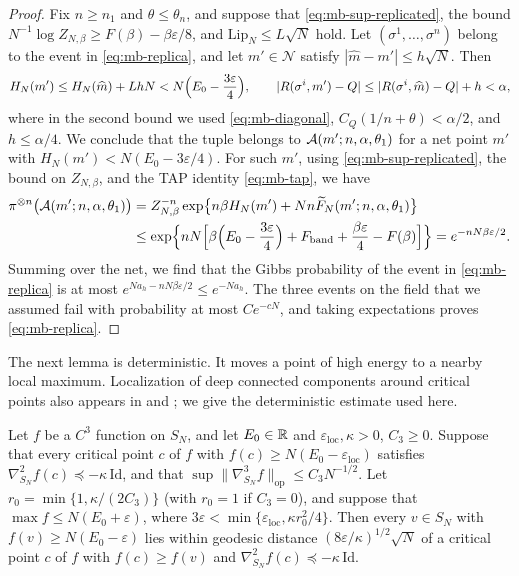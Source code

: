 \begin{proof}
Fix $n\ge n_1$ and $\theta\le\theta_n$, and suppose that \eqref{eq:mb-sup-replicated}, the bound $N^{-1}\log Z_{N,\beta}\ge F(\beta)-\beta\varepsilon/8$, and $\mathrm{Lip}_N\le L\sqrt N$ hold. Let $(\sigma^1,\dots,\sigma^n)$ belong to the event in \eqref{eq:mb-replica}, and let $m'\in\mathcal N$ satisfy $|\widehat m-m'|\le h\sqrt N$. Then
\[
H_N(m')\le H_N(\widehat m)+LhN<N\Bigl(E_0-\frac{3\varepsilon}4\Bigr),\qquad |R(\sigma^i,m')-Q|\le|R(\sigma^i,\widehat m)-Q|+h<\alpha,
\]
where in the second bound we used \eqref{eq:mb-diagonal}, $C_Q(1/n+\theta)<\alpha/2$, and $h\le\alpha/4$. We conclude that the tuple belongs to $\mathcal A(m';n,\alpha,\theta_1)$ for a net point $m'$ with $H_N(m')<N(E_0-3\varepsilon/4)$. For such $m'$, using \eqref{eq:mb-sup-replicated}, the bound on $Z_{N,\beta}$, and the TAP identity \eqref{eq:mb-tap}, we have
\[
\begin{aligned}
\pi^{\otimes n}\bigl(\mathcal A(m';n,\alpha,\theta_1)\bigr)&=Z_{N,\beta}^{-n}\exp\bigl\{n\beta H_N(m')+Nn\widetilde F_N(m';n,\alpha,\theta_1)\bigr\}\\
&\le\exp\Bigl\{nN\Bigl[\beta\Bigl(E_0-\frac{3\varepsilon}4\Bigr)+F_{\mathrm{band}}+\frac{\beta\varepsilon}4-F(\beta)\Bigr]\Bigr\}=e^{-nN\beta\varepsilon/2}.
\end{aligned}
\]
Summing over the net, we find that the Gibbs probability of the event in \eqref{eq:mb-replica} is at most $e^{Na_h-nN\beta\varepsilon/2}\le e^{-Na_h}$. The three events on the field that we assumed fail with probability at most $Ce^{-cN}$, and taking expectations proves \eqref{eq:mb-replica}.
\end{proof}

The next lemma is deterministic. It moves a point of high energy to a nearby local maximum. Localization of deep connected components around critical points also appears in \cite[Proposition~39]{BenArousSubagZeitouni2020} and \cite[Corollary~1.5 and its proof]{Sellke2025marginal}; we give the deterministic estimate used here.

\begin{lemma}\label{lem:mb-localization}
Let $f$ be a $C^3$ function on $S_N$, and let $E_0\in\mathbb R$ and $\varepsilon_{\mathrm{loc}},\kappa>0$, $C_3\ge0$. Suppose that every critical point $c$ of $f$ with $f(c)\ge N(E_0-\varepsilon_{\mathrm{loc}})$ satisfies $\nabla^2_{S_N}f(c)\preceq-\kappa\,\mathrm{Id}$, and that $\sup\|\nabla^3_{S_N}f\|_{\mathrm{op}}\le C_3N^{-1/2}$. Let $r_0=\min\{1,\kappa/(2C_3)\}$ (with $r_0=1$ if $C_3=0$), and suppose that $\max f\le N(E_0+\varepsilon)$, where $3\varepsilon<\min\{\varepsilon_{\mathrm{loc}},\kappa r_0^2/4\}$. Then every $v\in S_N$ with $f(v)\ge N(E_0-\varepsilon)$ lies within geodesic distance $(8\varepsilon/\kappa)^{1/2}\sqrt N$ of a critical point $c$ of $f$ with $f(c)\ge f(v)$ and $\nabla^2_{S_N}f(c)\preceq-\kappa\,\mathrm{Id}$.
\end{lemma}

